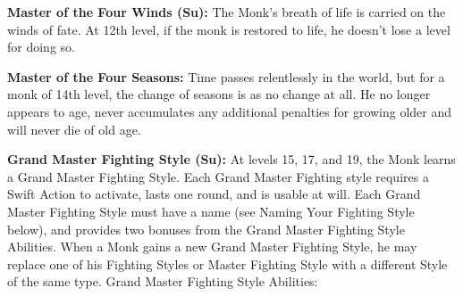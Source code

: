 \documentclass[10pt]{article}
\newcommand{\ability}[2]{\smallskip \noindent \textbf{#1} #2}
\begin{document}
\ability{Master of the Four Winds (Su):}{The Monk's breath of life is carried on the winds of fate. At 12th level, if the monk is restored to life, he doesn't lose a level for doing so.}

\ability{Master of the Four Seasons:}{Time passes relentlessly in the world, but for a monk of 14th level, the change of seasons is as no change at all. He no longer appears to age, never accumulates any additional penalties for growing older and will never die of old age.}

\ability{Grand Master Fighting Style (Su):}{At levels 15, 17, and 19, the Monk learns a Grand Master Fighting Style. Each Grand Master Fighting style requires a Swift Action to activate, lasts one round, and is usable at will. Each Grand Master Fighting Style must have a name (see Naming Your Fighting Style below), and provides two bonuses from the Grand Master Fighting Style Abilities. When a Monk gains a new Grand Master Fighting Style, he may replace one of his Fighting Styles or Master Fighting Style with a different Style of the same type. Grand Master Fighting Style Abilities:}
\end{document}
